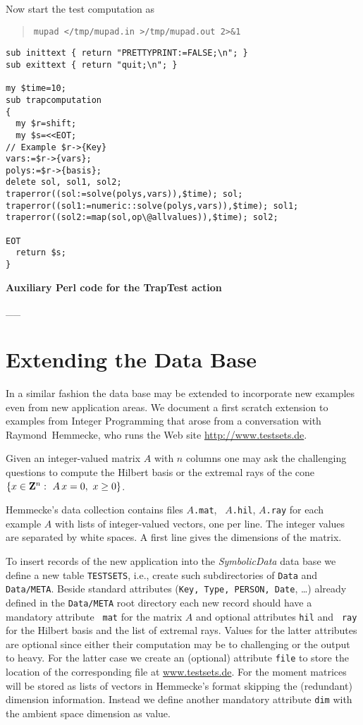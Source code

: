 \documentclass[11pt]{article}
\newcommand{\SD}{{\em Symbo\-lic\-Data}}
\begin{document}
Now start the test computation as
\begin{quote}\tt mupad </tmp/mupad.in >/tmp/mupad.out 2>\&1\end{quote} 

\begin{table}[ht]
{\small\begin{verbatim}
sub inittext { return "PRETTYPRINT:=FALSE;\n"; }
sub exittext { return "quit;\n"; }

my $time=10;
sub trapcomputation 
{
  my $r=shift;
  my $s=<<EOT;
// Example $r->{Key}
vars:=$r->{vars};
polys:=$r->{basis};
delete sol, sol1, sol2;
traperror((sol:=solve(polys,vars)),$time); sol; 
traperror((sol1:=numeric::solve(polys,vars)),$time); sol1; 
traperror((sol2:=map(sol,op\@allvalues)),$time); sol2; 

EOT
  return $s;
}
\end{verbatim}}
\centerline{\bf Auxiliary Perl code for the TrapTest action}
\_\hrulefill\_
\end{table}

\section{Extending the Data Base}

In a similar fashion the data base may be extended to incorporate new
examples even from new application areas. We document a first scratch
extension to examples from Integer Programming that arose from a
conversation with Raymond~Hemmecke, who runs the Web site
\url{http://www.testsets.de}.

Given an integer-valued matrix $A$ with $n$ columns one may ask
the challenging questions to compute the Hilbert basis or the
extremal rays of the cone $\{x \in {\bf Z}^n:\ A\,x=0,\ x\geq
0\}$.

Hemmecke's data collection contains files {\tt $A$.mat}, {\tt
$A$.hil}, {\tt $A$.ray} for each example $A$ with lists of
integer-valued vectors, one per line. The integer values are
separated by white spaces. A first line gives the dimensions of
the matrix.

To insert records of the new application into the {\SD} data base we
define a new table {\tt TESTSETS}, i.e., create such subdirectories of
{\tt Data} and {\tt Data/META}.  Beside standard attributes ({\tt Key,
Type, PERSON, Date}, \ldots) already defined in the {\tt Data/META}
root directory each new record should have a mandatory attribute {\tt
mat} for the matrix $A$ and optional attributes {\tt hil} and {\tt
ray} for the Hilbert basis and the list of extremal rays. Values for
the latter attributes are optional since either their computation may
be to challenging or the output to heavy. For the latter case we
create an (optional) attribute {\tt file} to store the location of the
corresponding file at \url{www.testsets.de}.  For the moment matrices
will be stored as lists of vectors in Hemmecke's format skipping the
(redundant) dimension information. Instead we define another mandatory
attribute {\tt dim} with the ambient space dimension as value.
\end{document}
